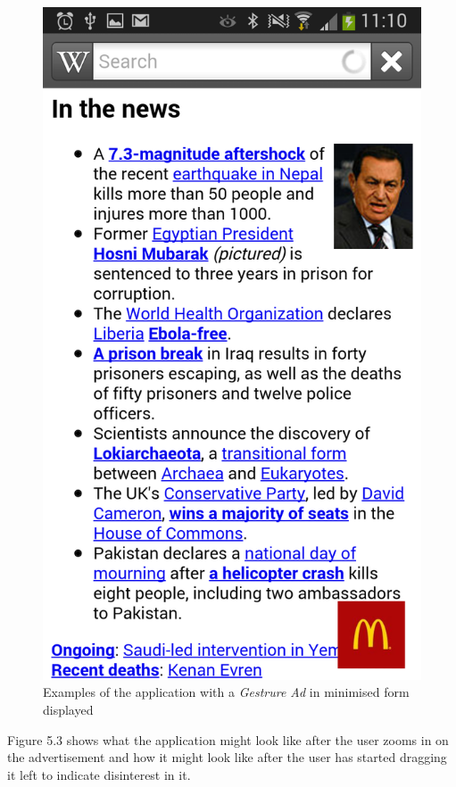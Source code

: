 \begin{figure}
\begin{center}
\includegraphics[scale=0.25]{Images/gesturead_small2.png}
\caption{Examples of the application with a \textit{Gestrure Ad} in minimised form displayed}
\label{fig:ads2}
\end{center}
\end{figure}

Figure 5.3 shows what the application might look like after the user zooms in on the advertisement and how it might look like after the user has started dragging it left to indicate disinterest in it.

